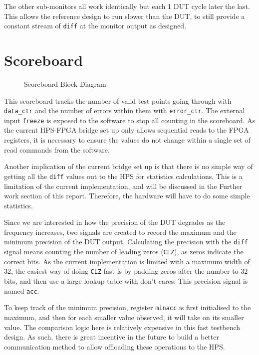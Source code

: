 The other sub-monitors all work identically but each 1 DUT cycle later the last.
This allows the reference design to run slower than the DUT, to still provide a constant stream of \texttt{diff} at the monitor output as designed.

\section{Scoreboard}

\begin{figure}[H]
  \centering
  
  \caption{Scoreboard Block Diagram}
  \label{ScoreboardBlk}
\end{figure}

This scoreboard tracks the number of valid test points going through with \texttt{data\_ctr} and the number of errors within them with \texttt{error\_ctr}.
The external input \texttt{freeze} is exposed to the software to stop all counting in the scoreboard.
As the current HPS-FPGA bridge set up only allows sequential reads to the FPGA registers, it is necessary to ensure the values do not change within a single set of read commands from the software.

Another implication of the current bridge set up is that there is no simple way of getting all the \texttt{diff} values out to the HPS for statistics calculations.
This is a limitation of the current implementation, and will be discussed in the Further work section of this report.
Therefore, the hardware will have to do some simple statistics.

Since we are interested in how the precision of the DUT degrades as the frequency increases, two signals are created to record the maximum and the minimum precision of the DUT output.
Calculating the precision with the \texttt{diff} signal means counting the number of leading zeros (\texttt{CLZ}), as zeros indicate the correct bits.
As the current implementation is limited with a maximum width of 32, the easiest way of doing \texttt{CLZ} fast is by padding zeros after the number to 32 bits, and then use a large lookup table with don't cares.
This precision signal is named \texttt{acc}.

To keep track of the minimum precision, register \texttt{minacc} is first initialised to the maximum, and then for each smaller value observed, it will take on its smaller value.
The comparison logic here is relatively expensive in this fast testbench design.
As such, there is great incentive in the future to build a better communication method to allow offloading these operations to the HPS.

